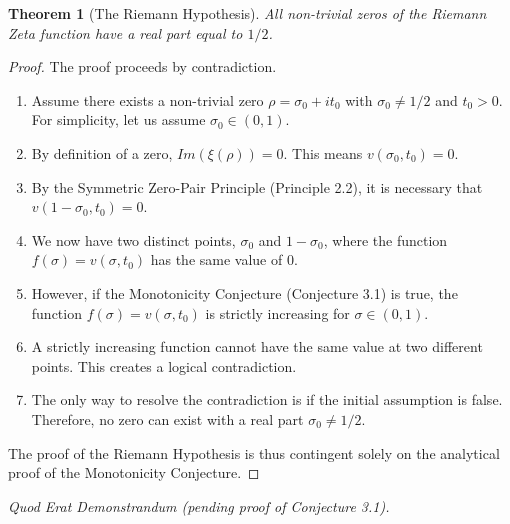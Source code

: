 \documentclass{article}
\newtheorem{theorem}{Theorem}[section]
\begin{document}
\begin{theorem}[The Riemann Hypothesis]
All non-trivial zeros of the Riemann Zeta function have a real part equal to $1/2$.
\end{theorem}
\begin{proof}
The proof proceeds by contradiction.
\begin{enumerate}
    \item Assume there exists a non-trivial zero $\rho = \sigma_0 + it_0$ with $\sigma_0 \neq 1/2$ and $t_0 > 0$. For simplicity, let us assume $\sigma_0 \in (0, 1)$.
    \item By definition of a zero, $Im(\xi(\rho)) = 0$. This means $v(\sigma_0, t_0) = 0$.
    \item By the Symmetric Zero-Pair Principle (Principle 2.2), it is necessary that $v(1-\sigma_0, t_0) = 0$.
    \item We now have two distinct points, $\sigma_0$ and $1-\sigma_0$, where the function $f(\sigma) = v(\sigma, t_0)$ has the same value of 0.
    \item However, if the Monotonicity Conjecture (Conjecture 3.1) is true, the function $f(\sigma) = v(\sigma, t_0)$ is strictly increasing for $\sigma \in (0,1)$.
    \item A strictly increasing function cannot have the same value at two different points. This creates a logical contradiction.
    \item The only way to resolve the contradiction is if the initial assumption is false. Therefore, no zero can exist with a real part $\sigma_0 \neq 1/2$.
\end{enumerate}
The proof of the Riemann Hypothesis is thus contingent solely on the analytical proof of the Monotonicity Conjecture.
\end{proof}
\begin{center}
    \textit{Quod Erat Demonstrandum (pending proof of Conjecture 3.1).}
\end{center}
\end{document}
